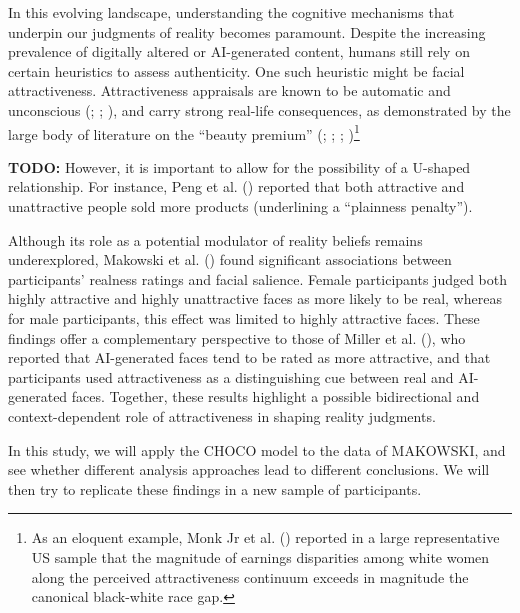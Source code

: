 \documentclass[
  jou,
  floatsintext,
  longtable,
  nolmodern,
  notxfonts,
  notimes,
  colorlinks=true,linkcolor=blue,citecolor=blue,urlcolor=blue]{apa7}
\begin{document}
In this evolving landscape, understanding the cognitive mechanisms that
underpin our judgments of reality becomes paramount. Despite the
increasing prevalence of digitally altered or AI-generated content,
humans still rely on certain heuristics to assess authenticity. One such
heuristic might be facial attractiveness. Attractiveness appraisals are
known to be automatic and unconscious (; ;
), and carry strong
real-life consequences, as demonstrated by the large body of literature
on the ``beauty premium'' (; ;
;
)\footnote{As an
  eloquent example, Monk Jr et al.
  () reported in a large
  representative US sample that the magnitude of earnings disparities
  among white women along the perceived attractiveness continuum exceeds
  in magnitude the canonical black-white race gap.}

\textbf{TODO:} However, it is important to allow for the possibility of
a U-shaped relationship. For instance, Peng et al.
() reported that both attractive and
unattractive people sold more products (underlining a ``plainness
penalty'').

Although its role as a potential modulator of reality beliefs remains
underexplored, Makowski et al. ()
found significant associations between participants' realness ratings
and facial salience. Female participants judged both highly attractive
and highly unattractive faces as more likely to be real, whereas for
male participants, this effect was limited to highly attractive faces.
These findings offer a complementary perspective to those of Miller et
al. (), who reported that AI-generated
faces tend to be rated as more attractive, and that participants used
attractiveness as a distinguishing cue between real and AI-generated
faces. Together, these results highlight a possible bidirectional and
context-dependent role of attractiveness in shaping reality judgments.

In this study, we will apply the CHOCO model to the data of MAKOWSKI,
and see whether different analysis approaches lead to different
conclusions. We will then try to replicate these findings in a new
sample of participants.
\end{document}
